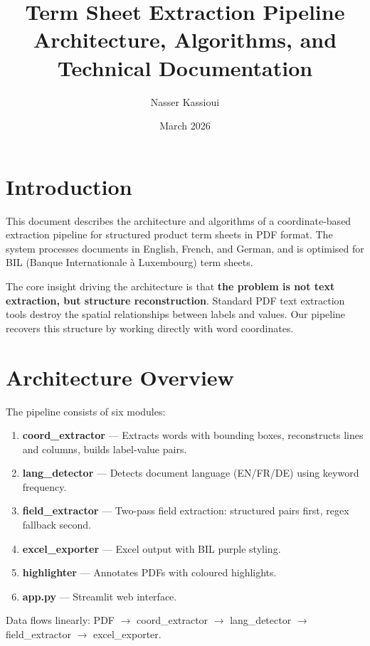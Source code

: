 \documentclass[11pt,a4paper]{article}
\title{
  \textcolor{bilpurple}{\textbf{Term Sheet Extraction Pipeline}}\\
  \large Architecture, Algorithms, and Technical Documentation
}
\author{Nasser Kassioui}
\date{March 2026}
\begin{document}
\maketitle
\tableofcontents
\newpage

\section{Introduction}

This document describes the architecture and algorithms of a coordinate-based
extraction pipeline for structured product term sheets in PDF format. The system
processes documents in English, French, and German, and is optimised for
BIL (Banque Internationale \`a Luxembourg) term sheets.

The core insight driving the architecture is that \textbf{the problem is not
text extraction, but structure reconstruction}. Standard PDF text extraction
tools destroy the spatial relationships between labels and values. Our pipeline
recovers this structure by working directly with word coordinates.

\section{Architecture Overview}

The pipeline consists of six modules:

\begin{enumerate}[label=\arabic*.]
  \item \textbf{coord\_extractor} --- Extracts words with bounding boxes,
        reconstructs lines and columns, builds label-value pairs.
  \item \textbf{lang\_detector} --- Detects document language (EN/FR/DE)
        using keyword frequency.
  \item \textbf{field\_extractor} --- Two-pass field extraction: structured
        pairs first, regex fallback second.
  \item \textbf{excel\_exporter} --- Excel output with BIL purple styling.
  \item \textbf{highlighter} --- Annotates PDFs with coloured highlights.
  \item \textbf{app.py} --- Streamlit web interface.
\end{enumerate}

Data flows linearly: PDF $\rightarrow$ coord\_extractor $\rightarrow$
lang\_detector $\rightarrow$ field\_extractor $\rightarrow$ excel\_exporter.
\end{document}
